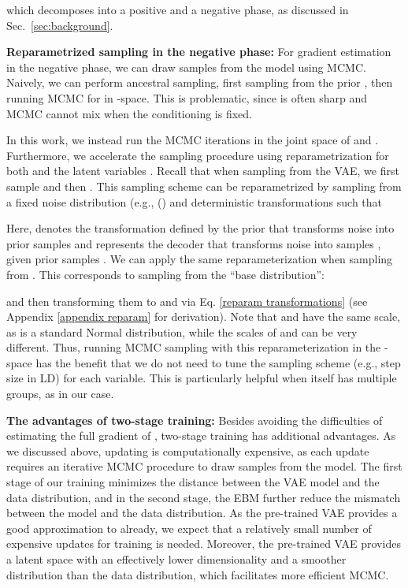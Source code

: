 \documentclass{article} \usepackage{iclr2021_conference,times}
\begin{document}
which decomposes into a positive and a negative phase, as discussed in Sec.~\ref{sec:background}.


\textbf{Reparametrized sampling in the negative phase:} For gradient estimation in the negative phase, we can draw samples from the model using MCMC.
Naively, we can perform ancestral sampling, first sampling from the prior , then running MCMC for  in -space. 
This is problematic, since  is often sharp and MCMC cannot mix when the conditioning  is fixed.

In this work, we instead run the MCMC iterations in the joint space of  and . Furthermore, we accelerate the sampling procedure using reparametrization for both  and the latent variables . Recall that when sampling from the VAE, we first sample  and then . This sampling scheme can be reparametrized by sampling from a fixed noise distribution (e.g., () and deterministic transformations  such that 

Here,  denotes the transformation defined by the prior that transforms noise  into prior samples  and  represents the decoder that transforms noise  into samples , given prior samples .
We can apply the same reparameterization when sampling from . This corresponds to sampling  from the ``base distribution'': 

and then transforming them to  and  via Eq. \ref{reparam transformations} (see Appendix \ref{appendix reparam} for derivation). Note that  and  have the same scale, as  is a standard Normal distribution, while the scales of  and  can be very different. Thus, running MCMC sampling with this reparameterization in the -space has the benefit that we do not need to tune the sampling scheme (e.g., step size in LD) for each variable. This is particularly helpful when  itself has multiple groups, as in our case. 

\textbf{The advantages of two-stage training: }
Besides avoiding the difficulties of estimating the full gradient of , two-stage training has additional advantages. As we discussed above, updating  is computationally expensive, as each update requires an iterative MCMC procedure to draw samples from the model. The first stage of our training minimizes the distance between the VAE model and the data distribution, and in the second stage, the EBM further reduce the mismatch between the model and the data distribution.
As the pre-trained VAE  provides a good approximation to  already, we expect that a relatively small number of expensive updates for training  is needed. Moreover, the pre-trained VAE provides a latent space with an effectively lower dimensionality and a smoother distribution than the data distribution, which facilitates more efficient MCMC. 
\end{document}
